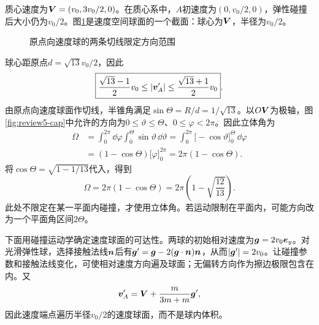 \begin{solution}
质心速度为$\bm{V}=(v_0,3v_0/2,0)$。在质心系中，$A$初速度为$(0,v_0/2,0)$，弹性碰撞后大小仍为$v_0/2$。图\ref{fig:hw5-6-s}是速度空间球面的一个截面：球心为$\bm{V}$，半径为$v_0/2$。

\begin{figure}[H]\centering
{}
\caption{原点向速度球的两条切线限定方向范围}\label{fig:hw5-6-s}
\end{figure}

球心距原点$d=\sqrt{13}v_0/2$，因此
\[
 \boxed{\frac{\sqrt{13}-1}{2}v_0\le|\bm{v}_A'|
 \le\frac{\sqrt{13}+1}{2}v_0}.
\]
由原点向速度球面作切线，半锥角满足$\sin\Theta=R/d=1/\sqrt{13}$。以$O\bm{V}$为极轴，图\ref{fig:review5-cap}中允许的方向为$0\le\vartheta\le\Theta$、$0\le\varphi<2\pi$。因此立体角为
\[
\begin{aligned}
\Omega&=\int_0^{2\pi}\dd\varphi\int_0^\Theta\sin\vartheta\,\dd\vartheta
=\int_0^{2\pi}\bigl[-\cos\vartheta\bigr]_0^\Theta\,\dd\varphi\\
&=(1-\cos\Theta)\bigl[\varphi\bigr]_0^{2\pi}
=2\pi(1-\cos\Theta).
\end{aligned}
\]
将$\cos\Theta=\sqrt{1-1/13}$代入，得到
\[
 \boxed{\Omega=2\pi(1-\cos\Theta)
 =2\pi\left(1-\sqrt{\frac{12}{13}}\right)}.
\]
此处不限定在某一平面内碰撞，才使用立体角。若运动限制在平面内，可能方向改为一个平面角区间$2\Theta$。


下面用碰撞运动学确定速度球面的可达性。两球的初始相对速度为$\bm{g}=2v_0\bm{e}_y$。对光滑弹性球，选择接触法线$\bm{n}$后有$\bm{g}'=\bm{g}-2(\bm{g}\cdot\bm{n})\bm{n}$，从而$|\bm{g}'|=2v_0$。让碰撞参数和接触法线变化，可使相对速度方向遍及球面；无偏转方向作为擦边极限包含在内。又
\[
 \bm{v}_A'=\bm{V}+\frac{m}{3m+m}\bm{g}',
\]
因此速度端点遍历半径$v_0/2$的速度球面，而不是球内体积。


\end{solution}

